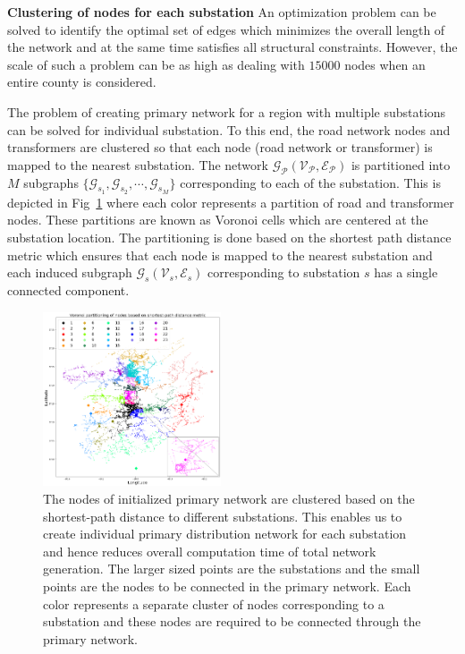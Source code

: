 \documentclass[sigconf]{acmart}
\begin{document}
\noindent\textbf{Clustering of nodes for each substation}
An optimization problem can be solved to identify the optimal set of edges which minimizes the overall length of the network and at the same time satisfies all structural constraints. However, the scale of such a problem can be as high as dealing with $15000$ nodes when an entire county is considered. 

The problem of creating primary network for a region with multiple substations can be solved for individual substation. To this end, the road network nodes and transformers are clustered so that each node (road network or transformer) is mapped to the nearest substation. The network $\mathcal{G_P}(\mathcal{V_P},\mathcal{E_P})$ is partitioned into $M$ subgraphs $\{\mathcal{G}_{s_1},\mathcal{G}_{s_2},\cdots,\mathcal{G}_{s_M}\}$ corresponding to each of the substation. This is depicted in Fig~\ref{fig:voronoi} where each color represents a partition of road and transformer nodes. These partitions are known as Voronoi cells which are centered at the substation location. The partitioning is done based on the shortest path distance metric which ensures that each node is mapped to the nearest substation and each induced subgraph $\mathcal{G}_{s}(\mathcal{V}_s,\mathcal{E}_s)$ corresponding to substation $s$ has a single connected component.
\begin{figure}
	\centering
	\includegraphics[width=0.47\textwidth]{figs/voronoi.png}
	\caption{The nodes of initialized primary network are clustered based on the shortest-path distance to different substations. This enables us to create individual primary distribution network for each substation and hence reduces overall computation time of total network generation. The larger sized points are the substations and the small points are the nodes to be connected in the primary network. Each color represents a separate cluster of nodes corresponding to a substation and these nodes are required to be connected through the primary network.}
	\label{fig:voronoi}
\end{figure}
\end{document}

